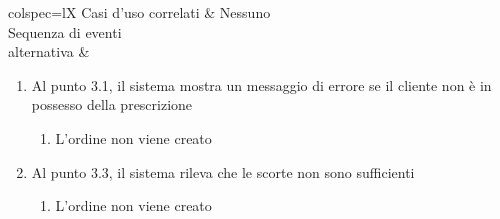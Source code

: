 \begin{table}[!hbp]
\begin{scenery}{colspec=lX}
		Casi d'uso correlati & Nessuno \\
		{Sequenza di eventi \\ alternativa} &
			\begin{enumerate}
				\item Al punto 3.1, il sistema mostra un messaggio di errore se il cliente non è in possesso della prescrizione
				\begin{enumerate}[label*=\arabic*.]
					\item L'ordine non viene creato
				\end{enumerate}
				\item Al punto 3.3, il sistema rileva che le scorte non sono sufficienti
				\begin{enumerate}[label*=\arabic*.]
					\item L'ordine non viene creato
				\end{enumerate}
			\end{enumerate} \\
	\end{scenery}
\end{table}
